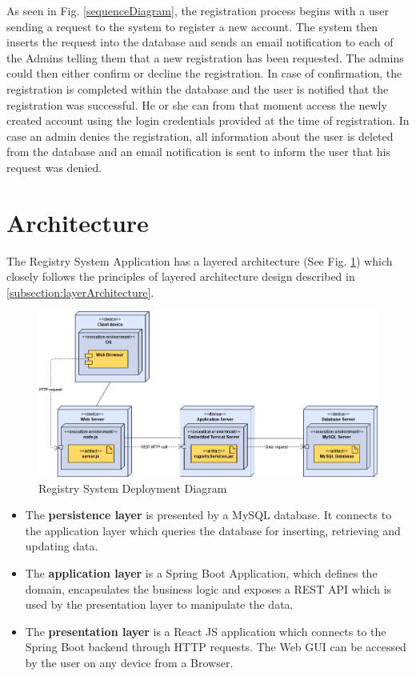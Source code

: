 As seen in Fig. \ref{sequenceDiagram}, the registration process begins with a user sending a request to the system to register a new account. The system then inserts the request into the database and sends an email notification to each of the Admins telling them that a new registration has been requested. The admins could then either confirm or decline the registration. In case of confirmation, the registration is completed within the database and the user is notified that the registration was successful. He or she can from that moment access the newly created account using the login credentials provided at the time of registration. In case an admin denies the registration, all information about the user is deleted from the database and an email notification is sent to inform the user that his request was denied.



\section{Architecture}
\label{section:architecture}

The Registry System Application has a layered architecture (See Fig. \ref{deployment}) which closely follows the principles of layered architecture design described in \ref{subsection:layerArchitecture}.

\begin{figure}[H]
    \centering
    \includegraphics[width=6.5in]{images/deployment}
    \caption{Registry System Deployment Diagram}
    \label{deployment}
\end{figure}

\begin{itemize}
    \item The \textbf{persistence layer} is presented by a MySQL database. It connects to the application layer which queries the database for inserting, retrieving and updating data.
    \item The \textbf{application layer} is a Spring Boot Application, which defines the domain, encapsulates the business logic and exposes a REST API which is used by the presentation layer to manipulate the data.
    \item The \textbf{presentation layer} is a React JS application which connects to the Spring Boot backend through HTTP requests. The Web GUI can be accessed by the user on any device from a Browser.
\end{itemize}

